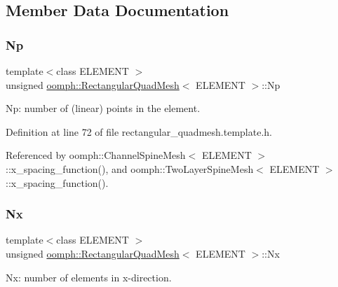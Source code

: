 \subsection{Member Data Documentation}
\mbox{\label{classoomph_1_1RectangularQuadMesh_a92502c7536a6644ebffd806841cd4d98}} 
\subsubsection{\texorpdfstring{Np}{Np}}
{\footnotesize\ttfamily template$<$class E\+L\+E\+M\+E\+NT $>$ \\
unsigned \hyperlink{classoomph_1_1RectangularQuadMesh}{oomph\+::\+Rectangular\+Quad\+Mesh}$<$ E\+L\+E\+M\+E\+NT $>$\+::Np\hspace{0.3cm}{\ttfamily [protected]}}



Np\+: number of (linear) points in the element. 



Definition at line 72 of file rectangular\+\_\+quadmesh.\+template.\+h.



Referenced by oomph\+::\+Channel\+Spine\+Mesh$<$ E\+L\+E\+M\+E\+N\+T $>$\+::x\+\_\+spacing\+\_\+function(), and oomph\+::\+Two\+Layer\+Spine\+Mesh$<$ E\+L\+E\+M\+E\+N\+T $>$\+::x\+\_\+spacing\+\_\+function().

\mbox{\label{classoomph_1_1RectangularQuadMesh_a1b2c0a2d1f8399713033953c72d399ee}} 
\subsubsection{\texorpdfstring{Nx}{Nx}}
{\footnotesize\ttfamily template$<$class E\+L\+E\+M\+E\+NT $>$ \\
unsigned \hyperlink{classoomph_1_1RectangularQuadMesh}{oomph\+::\+Rectangular\+Quad\+Mesh}$<$ E\+L\+E\+M\+E\+NT $>$\+::Nx\hspace{0.3cm}{\ttfamily [protected]}}



Nx\+: number of elements in x-\/direction. 



